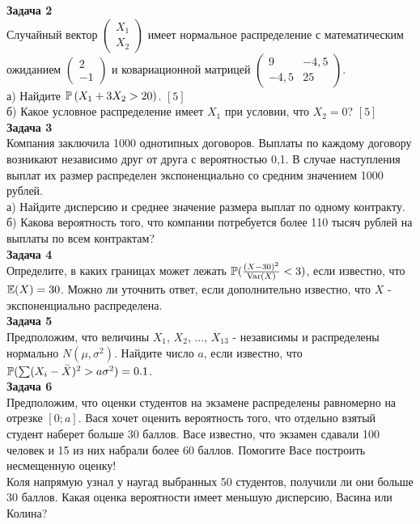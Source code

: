 \documentclass[12pt, a4paper]{article}\usepackage[]{graphicx}\usepackage[]{color}
\begin{document}
	\textbf{Задача 2} \\ %
	Случайный вектор  $\left(\begin{array}{c}
	{X_{1} } \\ {X_{2} }
	\end{array}\right)$  имеет нормальное распределение с
	математическим ожиданием  $\left(\begin{array}{c} {2} \\ {-1}
	\end{array}\right)$  и ковариационной матрицей
	$\left(\begin{array}{cc} {9} & {-4,5} \\ {-4,5} & {25}
	\end{array}\right)$. \\
	а) Найдите  $\P\left(X_{1} +3X_{2} >20\right)$. $[5]$ \\
	б) Какое условное распределение имеет $X_{1}$ при условии, что $X_{2}=0$? $[5]$ \\


	\textbf{Задача 3} \\ %
	Компания заключила 1000 однотипных договоров. Выплаты по каждому договору возникают независимо друг от друга с вероятностью 0,1. В случае наступления выплат их размер распределен экспоненциально со средним значением 1000 рублей. \\
	а) Найдите дисперсию и среднее значение размера выплат по одному контракту. \\
	б) Какова вероятность того, что компании потребуется более 110 тысяч рублей на выплаты по всем контрактам? \\

	\textbf{Задача 4} \\ %
	Определите, в каких границах может лежать $\P(\frac{(X-30)^{2}}{\Var(X)}<3)$, если известно, что $\E(X)=30$. Можно ли уточнить ответ, если дополнительно известно, что $X$ - экспоненциально распределена. \\

	\textbf{Задача 5} \\ %
	Предположим, что величины $X_{1}$, $X_{2}$, ..., $X_{13}$ - независимы и распределены нормально $N(\mu,\sigma^{2})$. Найдите число $a$, если известно, что $\P( \sum (X_{i}-\bar{X})^{2}>a\sigma^{2})=0.1$. \\

	\textbf{Задача 6} \\
	Предположим, что оценки студентов на экзамене распределены равномерно на отрезке $[0;a]$. Вася хочет оценить вероятность того, что отдельно взятый студент наберет больше 30 баллов. Васе известно, что экзамен сдавали 100 человек и 15 из них набрали более 60 баллов. Помогите Васе построить несмещенную оценку! \\
	Коля напрямую узнал у наугад выбранных 50 студентов, получили ли они больше 30 баллов. Какая оценка вероятности имеет меньшую дисперсию, Васина или Колина? \\
\end{document}

